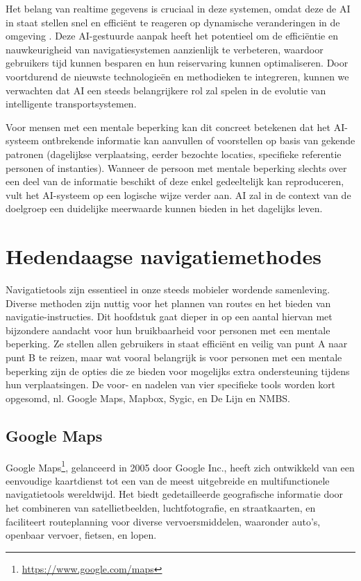Het belang van realtime gegevens is cruciaal in deze systemen, omdat deze de AI in staat stellen snel en efficiënt te reageren op dynamische veranderingen in de omgeving \autocite{Ciravegna2018}. Deze AI-gestuurde aanpak heeft het potentieel om de efficiëntie en nauwkeurigheid van navigatiesystemen aanzienlijk te verbeteren, waardoor gebruikers tijd kunnen besparen en hun reiservaring kunnen optimaliseren. Door voortdurend de nieuwste technologieën en methodieken te integreren, kunnen we verwachten dat AI een steeds belangrijkere rol zal spelen in de evolutie van intelligente transportsystemen.

Voor mensen met een mentale beperking kan dit concreet betekenen dat het AI-systeem ontbrekende informatie kan aanvullen of voorstellen op basis van gekende patronen (dagelijkse verplaatsing, eerder bezochte locaties, specifieke referentie personen of instanties). Wanneer de persoon met mentale beperking slechts over een deel van de informatie beschikt of deze enkel gedeeltelijk kan reproduceren, vult het AI-systeem op een logische wijze verder aan. AI zal in de context van de doelgroep een duidelijke meerwaarde kunnen bieden in het dagelijks leven.

\section{Hedendaagse navigatiemethodes}
\label{sec:hedendaagse-navigatiemethodes}


Navigatietools zijn essentieel in onze steeds mobieler wordende samenleving. Diverse methoden zijn nuttig voor het plannen van routes en het bieden van navigatie-instructies. Dit hoofdstuk gaat dieper in op een aantal hiervan met bijzondere aandacht voor hun bruikbaarheid voor personen met een mentale beperking.  Ze stellen allen gebruikers in staat efficiënt en veilig van punt A naar punt B te reizen, maar wat vooral belangrijk is voor personen met een mentale beperking zijn de opties die ze bieden voor mogelijks extra ondersteuning tijdens hun verplaatsingen. De voor- en nadelen van vier specifieke tools worden kort opgesomd, nl. Google Maps, Mapbox, Sygic, en De Lijn en NMBS.

\subsection{Google Maps}
\label{sec:google-maps}
Google Maps\footnote{\url{https://www.google.com/maps}}, gelanceerd in 2005 door Google Inc., heeft zich ontwikkeld van een eenvoudige kaartdienst tot een van de meest uitgebreide en multifunctionele navigatietools wereldwijd. Het biedt gedetailleerde geografische informatie door het combineren van satellietbeelden, luchtfotografie, en straatkaarten, en faciliteert routeplanning voor diverse vervoersmiddelen, waaronder auto's, openbaar vervoer, fietsen, en lopen. 

